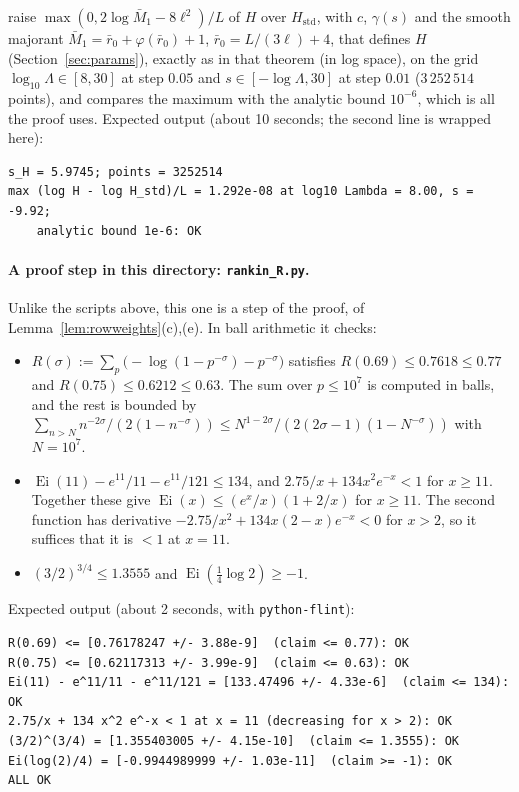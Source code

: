 \begin{itemize}
raise $\max(0,2\log\bar M_1-8\ell^2)/L$ of $H$ over $H_{\mathrm{std}}$, with $c$, $\gamma(s)$ and the smooth majorant
$\bar M_1=\bar r_0+\varphi(\bar r_0)+1$, $\bar r_0=L/(3\ell)+4$, that defines $H$ (Section~\ref{sec:params}), exactly as in that
theorem (in log space), on the grid $\log_{10}\Lambda\in[8,30]$ at step $0.05$ and $s\in[-\log\Lambda,30]$ at step $0.01$
($3\,252\,514$ points), and compares the maximum with the analytic bound $10^{-6}$, which is all the proof uses. Expected output
(about 10 seconds; the second line is wrapped here):
\begingroup\footnotesize
\begin{verbatim}
s_H = 5.9745; points = 3252514
max (log H - log H_std)/L = 1.292e-08 at log10 Lambda = 8.00, s = -9.92;
    analytic bound 1e-6: OK
\end{verbatim}
\endgroup
\end{itemize}
\paragraph{A proof step in this directory: \texttt{rankin\_R.py}.}\label{app:cert-rankin}
Unlike the scripts above, this one is a step of the proof, of Lemma~\ref{lem:rowweights}(c),(e). In ball arithmetic it checks:
\begin{itemize}
\item $R(\sigma):=\sum_p\bigl(-\log(1-p^{-\sigma})-p^{-\sigma}\bigr)$ satisfies $R(0.69)\le0.7618\le0.77$ and $R(0.75)\le0.6212\le0.63$.
The sum over $p\le10^7$ is computed in balls, and the rest is bounded by
$\sum_{n>N}n^{-2\sigma}/(2(1-n^{-\sigma}))\le N^{1-2\sigma}/(2(2\sigma-1)(1-N^{-\sigma}))$ with $N=10^7$.
\item $\operatorname{Ei}(11)-e^{11}/11-e^{11}/121\le134$, and $2.75/x+134x^2e^{-x}<1$ for $x\ge11$. Together these give
$\operatorname{Ei}(x)\le(e^x/x)(1+2/x)$ for $x\ge11$. The second function has derivative $-2.75/x^2+134x(2-x)e^{-x}<0$ for $x>2$,
so it suffices that it is $<1$ at $x=11$.
\item $(3/2)^{3/4}\le1.3555$ and $\operatorname{Ei}(\tfrac14\log2)\ge-1$.
\end{itemize}
Expected output (about 2 seconds, with \texttt{python-flint}):
\begingroup\footnotesize
\begin{verbatim}
R(0.69) <= [0.76178247 +/- 3.88e-9]  (claim <= 0.77): OK
R(0.75) <= [0.62117313 +/- 3.99e-9]  (claim <= 0.63): OK
Ei(11) - e^11/11 - e^11/121 = [133.47496 +/- 4.33e-6]  (claim <= 134): OK
2.75/x + 134 x^2 e^-x < 1 at x = 11 (decreasing for x > 2): OK
(3/2)^(3/4) = [1.355403005 +/- 4.15e-10]  (claim <= 1.3555): OK
Ei(log(2)/4) = [-0.9944989999 +/- 1.03e-11]  (claim >= -1): OK
ALL OK
\end{verbatim}
\endgroup

